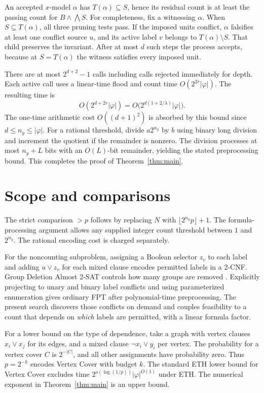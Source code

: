 \documentclass[11pt,a4paper]{amsart}
\newcommand{\size}{\lvert\varphi\rvert}
\begin{document}
An accepted \(x\)-model \(\alpha\) has \(T(\alpha)\subseteq S\), hence its residual count is at least the passing count for \(B\wedge\bigwedge S\). For completeness, fix a witnessing \(\alpha\). When \(S\subseteq T(\alpha)\), all three pruning tests pass. If the imposed units conflict, \(\alpha\) falsifies at least one conflict source \(u\), and its active label \(v\) belongs to \(T(\alpha)\setminus S\). That child preserves the invariant. After at most \(d\) such steps the process accepts, because at \(S=T(\alpha)\) the witness satisfies every imposed unit.

There are at most \(2^{d+2}-1\) calls including calls rejected immediately for depth. Each active call uses a linear-time flood and count time \(O(2^{2r}\size)\). The resulting time is
\[
 O(2^{d+2r}\size)=
 O\bigl(2^{d(1+2/\lambda)}\size\bigr).
\]
The one-time arithmetic cost \(O((d+1)^2)\) is absorbed by this bound since \(d\le n_y\le\size\). For a rational threshold, divide \(a2^{n_y}\) by \(b\) using binary long division and increment the quotient if the remainder is nonzero. The division processes at most \(n_y+L\) bits with an \(O(L)\)-bit remainder, yielding the stated preprocessing bound. This completes the proof of Theorem~\ref{thm:main}.

\section{Scope and comparisons}
The strict comparison \(>p\) follows by replacing \(N\) with \(\lfloor 2^{n_y}p\rfloor+1\). The formula-processing argument allows any supplied integer count threshold between \(1\) and \(2^{n_y}\). The rational encoding cost is charged separately.

For the noncounting subproblem, assigning a Boolean selector \(z_v\) to each label and adding \(u\vee z_v\) for each mixed clause encodes permitted labels in a 2-CNF. Group Deletion Almost 2-SAT controls how many groups are removed \cite[Proposition~22]{foucaud}. Explicitly projecting to unary and binary label conflicts and using parameterized enumeration \cite[Theorem~6]{enumeration} gives ordinary FPT after polynomial-time preprocessing. The present search discovers those conflicts on demand and couples feasibility to a count that depends on \emph{which} labels are permitted, with a linear formula factor.

For a lower bound on the type of dependence, take a graph with vertex clauses \(x_i\vee x_j\) for its edges, and a mixed clause \(\neg x_i\vee y_i\) per vertex. The probability for a vertex cover \(C\) is \(2^{-|C|}\), and all other assignments have probability zero. Thus \(p=2^{-k}\) encodes Vertex Cover with budget \(k\). The standard ETH lower bound for Vertex Cover \cite[Chapter~14]{cygan} excludes time \(2^{o(\log(1/p))}\size^{O(1)}\) under ETH. The numerical exponent in Theorem~\ref{thm:main} is an upper bound.
\end{document}
